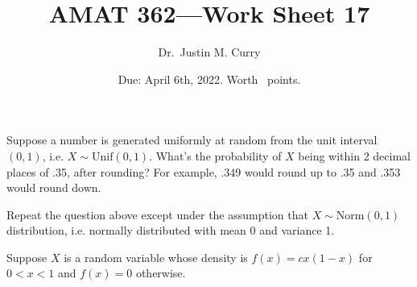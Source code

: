 \documentclass[addpoints,12pt]{exam}
\title{\vspace{-1in} AMAT 362---Work Sheet 17}
\date{Due: April 6th, 2022. Worth \numpoints\ points.}
\author{Dr.~Justin M. Curry}
\begin{document}
\maketitle






\begin{questions}

\question[1] Suppose a number is generated uniformly at random from the unit interval $(0,1)$, i.e. $X\sim \text{Unif}(0,1)$. What's the probability of $X$ being within 2 decimal places of .35, after rounding? For example, .349 would round up to .35 and .353 would round down.

\vspace{1.2in}

\question[1] Repeat the question above except under the assumption that $X\sim \text{Norm}(0,1)$ distribution, i.e. normally distributed with mean 0 and variance 1.

\vspace{1.2in}

\question[5] Suppose $X$ is a random variable whose density is $f(x)=cx(1-x)$ for $0<x<1$ and $f(x)=0$ otherwise.

\noaddpoints
{}
\end{questions}
\end{document}
